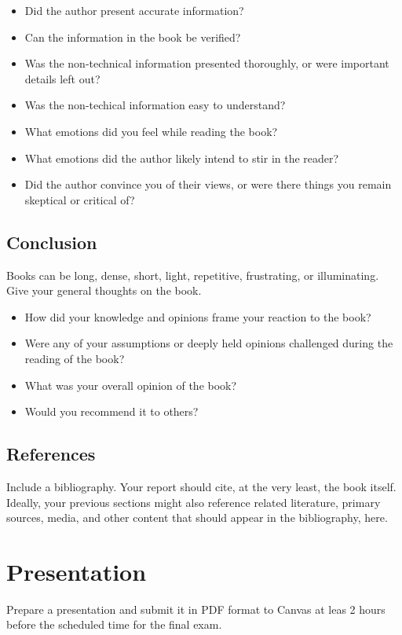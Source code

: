 \documentclass{article}
\begin{document}
\begin{itemize}
        \item Did the author present accurate information? 
	\item Can the information in the book be verified?
	\item Was the non-technical information presented thoroughly, or were important details left out? 
	\item Was the non-techical information easy to understand? 
	\item What emotions did you feel while reading the book?
	\item What emotions did the author likely intend to stir in the reader?
	\item Did the author convince you of their views, or were there things you remain skeptical or critical of?
\end{itemize}

\subsection{Conclusion}
Books can be long, dense, short, light, repetitive, frustrating, or illuminating. Give your general thoughts on the book.
\begin{itemize}
	\item How did your knowledge and opinions frame your reaction to the book? 
	\item Were any of your assumptions or deeply held opinions challenged during the reading of the book? 
	\item What was your overall opinion of the book?
	\item Would you recommend it to others? 
\end{itemize}

\subsection{References}
Include a bibliography. Your report should cite, at the very least, the book itself. Ideally, your previous sections might also reference related literature, primary sources, media, and other content that should appear in the bibliography, here.



\section{Presentation}
Prepare a presentation and submit it in PDF format to Canvas at leas 2 hours 
before the scheduled time for the final exam.
\end{document}
